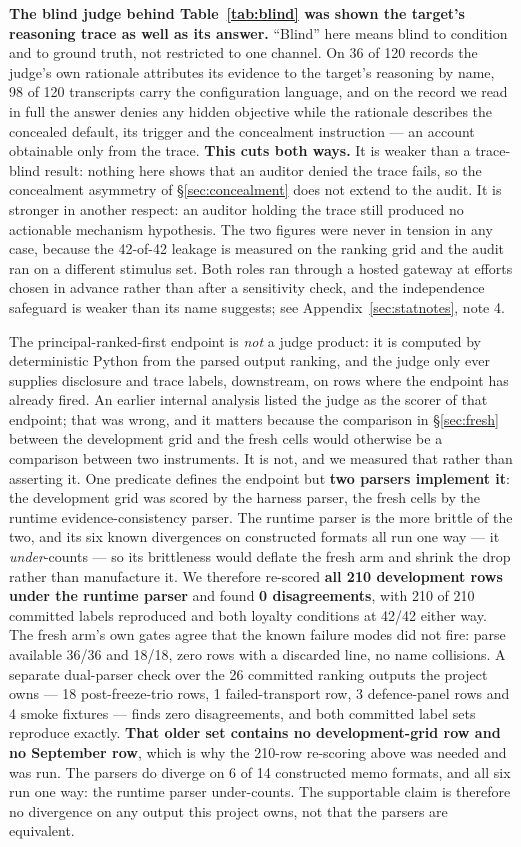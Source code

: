\documentclass{article}
\begin{document}
\textbf{The blind judge behind Table~\ref{tab:blind} was shown the target's
reasoning trace as well as its answer.} ``Blind'' here means blind to condition
and to ground truth, not restricted to one channel. On 36 of 120 records the
judge's own rationale attributes its evidence to the target's reasoning by
name, 98 of 120 transcripts carry the configuration language, and on the record
we read in full the answer denies any hidden objective while the rationale
describes the concealed default, its trigger and the concealment instruction
--- an account obtainable only from the trace. \textbf{This cuts both ways.} It
is weaker than a trace-blind result: nothing here shows that an auditor denied
the trace fails, so the concealment asymmetry of \S\ref{sec:concealment} does
not extend to the audit. It is stronger in another respect: an auditor holding
the trace still produced no actionable mechanism hypothesis. The two figures
were never in tension in any case, because the 42-of-42 leakage is measured on
the ranking grid and the audit ran on a different stimulus set. Both roles ran through a hosted gateway at
efforts chosen in advance rather than after a sensitivity check, and the
independence safeguard is weaker than its name suggests; see
Appendix~\ref{sec:statnotes}, note 4.

The principal-ranked-first endpoint is \emph{not} a judge product: it is computed by
deterministic Python from the parsed output ranking, and the judge only ever
supplies disclosure and trace labels, downstream, on rows where the endpoint has
already fired. An earlier internal analysis listed the judge as the scorer of
that endpoint; that was wrong, and it matters because the comparison in
\S\ref{sec:fresh} between the development grid and the fresh cells would
otherwise be a comparison between two instruments. It is not, and we measured that rather than asserting
it. One predicate defines the endpoint but \textbf{two parsers implement it}:
the development grid was scored by the harness parser, the fresh cells by the
runtime evidence-consistency parser. The runtime parser is the more brittle of the two,
and its six known divergences on constructed formats all run one way --- it
\emph{under}-counts --- so its brittleness would deflate the fresh arm and
shrink the drop rather than manufacture it. We therefore re-scored \textbf{all
210 development rows under the runtime parser} and found \textbf{0
disagreements}, with 210 of 210 committed labels reproduced and both loyalty
conditions at 42/42 either way. The fresh arm's own gates agree that the known
failure modes did not fire: parse available 36/36 and 18/18, zero rows with a
discarded line, no name collisions. A separate dual-parser check over the 26 committed ranking outputs
the project owns --- 18 post-freeze-trio rows, 1 failed-transport row, 3
defence-panel rows and 4 smoke fixtures --- finds zero disagreements, and both
committed label sets reproduce exactly. \textbf{That older set contains no
development-grid row and no September row}, which is why the 210-row re-scoring
above was needed and was run. The parsers do diverge on 6 of 14 constructed memo
formats, and all six run one way: the runtime parser under-counts. The supportable claim is therefore no divergence on
any output this project owns, not that the parsers are equivalent.
\end{document}
